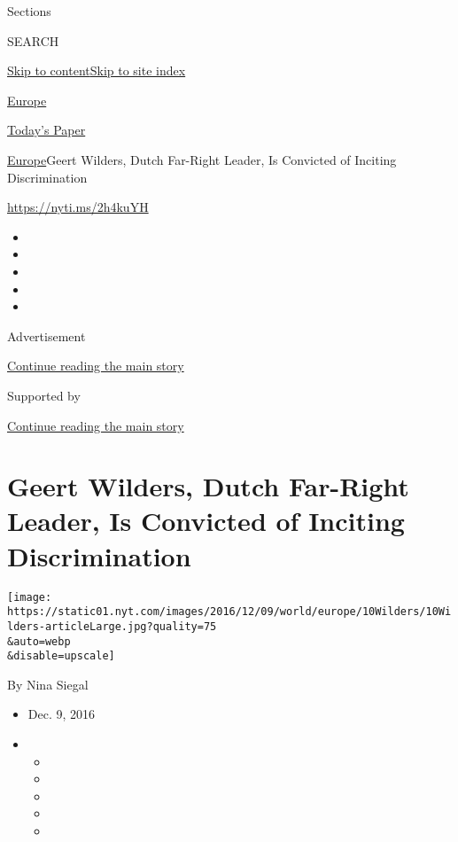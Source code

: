 Sections

SEARCH

\protect\hyperlink{site-content}{Skip to
content}\protect\hyperlink{site-index}{Skip to site index}

\href{https://www.nytimes.com/section/world/europe}{Europe}

\href{https://myaccount.nytimes.com/auth/login?response_type=cookie\&client_id=vi}{}

\href{https://www.nytimes.com/section/todayspaper}{Today's Paper}

\href{/section/world/europe}{Europe}\textbar{}Geert Wilders, Dutch
Far-Right Leader, Is Convicted of Inciting Discrimination

\url{https://nyti.ms/2h4kuYH}

\begin{itemize}
\item
\item
\item
\item
\item
\end{itemize}

Advertisement

\protect\hyperlink{after-top}{Continue reading the main story}

Supported by

\protect\hyperlink{after-sponsor}{Continue reading the main story}

\hypertarget{geert-wilders-dutch-far-right-leader-is-convicted-of-inciting-discrimination}{%
\section{Geert Wilders, Dutch Far-Right Leader, Is Convicted of Inciting
Discrimination}\label{geert-wilders-dutch-far-right-leader-is-convicted-of-inciting-discrimination}}

\texttt{[image: https://static01.nyt.com/images/2016/12/09/world/europe/10Wilders/10Wilders-articleLarge.jpg?quality=75\\\&auto=webp\\\&disable=upscale]}

By Nina Siegal

\begin{itemize}
\item
  Dec. 9, 2016
\item
  \begin{itemize}
  \item
  \item
  \item
  \item
  \item
  \end{itemize}
\end{itemize}

